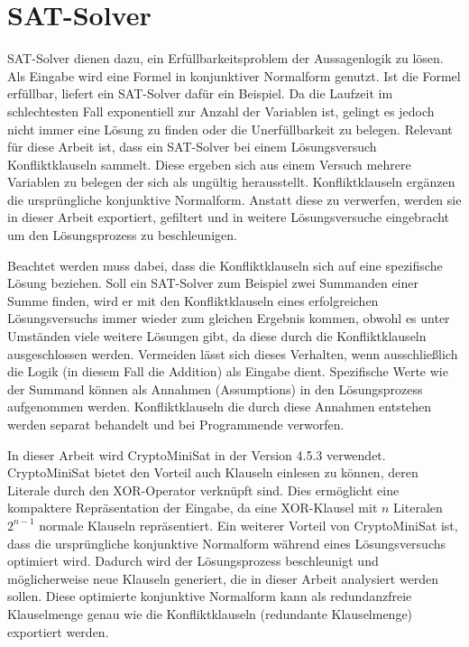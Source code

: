\section{SAT-Solver}
\label{sec:satsolver}

SAT-Solver dienen dazu, ein Erfüllbarkeitsproblem der Aussagenlogik zu lösen. Als Eingabe wird eine Formel in konjunktiver Normalform genutzt.
Ist die Formel erfüllbar, liefert ein SAT-Solver dafür ein Beispiel. Da die Laufzeit im schlechtesten Fall exponentiell zur Anzahl der Variablen
ist, gelingt es jedoch nicht immer eine Lösung zu finden oder die Unerfüllbarkeit zu belegen.
Relevant für diese Arbeit ist, dass ein SAT-Solver bei einem
Lösungsversuch Konfliktklauseln sammelt. Diese ergeben sich aus einem Versuch mehrere Variablen zu belegen der sich als ungültig herausstellt.
Konfliktklauseln ergänzen die ursprüngliche konjunktive Normalform. Anstatt diese zu verwerfen, werden sie in dieser Arbeit exportiert, gefiltert
und in weitere Lösungsversuche eingebracht um den Lösungsprozess zu beschleunigen.

Beachtet werden muss dabei, dass die Konfliktklauseln sich auf eine spezifische Lösung beziehen. Soll ein SAT-Solver zum Beispiel zwei Summanden
einer Summe finden, wird er mit den Konfliktklauseln eines erfolgreichen Lösungsversuchs immer wieder zum gleichen Ergebnis kommen, obwohl es
unter Umständen viele weitere Lösungen gibt, da diese durch die Konfliktklauseln ausgeschlossen werden. Vermeiden lässt sich dieses Verhalten,
wenn ausschließlich die Logik (in diesem Fall die Addition) als Eingabe dient. Spezifische Werte wie der Summand können als Annahmen (Assumptions)
in den Lösungsprozess aufgenommen werden. Konfliktklauseln die durch diese Annahmen entstehen werden separat behandelt und bei Programmende verworfen.

In dieser Arbeit wird CryptoMiniSat in der Version 4.5.3 verwendet. CryptoMiniSat bietet den Vorteil auch Klauseln einlesen zu können, deren Literale
durch den XOR-Operator verknüpft sind. Dies ermöglicht eine kompaktere Repräsentation der Eingabe, da eine XOR-Klausel mit $n$ Literalen $2^{n-1}$
normale Klauseln repräsentiert. Ein weiterer Vorteil von CryptoMiniSat ist, dass die ursprüngliche konjunktive Normalform während eines Lösungsversuchs
optimiert wird. Dadurch wird der Lösungsprozess beschleunigt und möglicherweise neue Klauseln generiert, die in dieser Arbeit analysiert werden sollen. 
Diese optimierte konjunktive Normalform kann als redundanzfreie Klauselmenge genau wie die Konfliktklauseln (redundante Klauselmenge) exportiert werden.